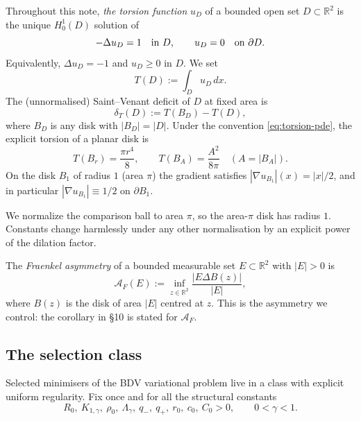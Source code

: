 \documentclass[11pt]{amsart}
\newcommand{\R}{\mathbb R}
\newcommand{\dT}{\delta_T}
\newcommand{\AF}{\mathcal A_F}
\begin{document}
Throughout this note, \emph{the torsion function} \(u_D\) of a bounded
open set \(D\subset\R^2\) is the unique \(H^1_0(D)\) solution of
\begin{equation}\label{eq:torsion-pde}
   -\Delta u_D=1\quad\hbox{in }D,
   \qquad
   u_D=0\quad\hbox{on }\partial D.
\end{equation}
Equivalently, \(\Delta u_D=-1\) and \(u_D\ge 0\) in \(D\).  We set
\[
   T(D):=\int_D u_D\,dx.
\]
The (unnormalised) Saint--Venant deficit of \(D\) at fixed area is
\[
   \dT(D):=T(B_D)-T(D),
\]
where \(B_D\) is any disk with \(|B_D|=|D|\).  Under the convention
\eqref{eq:torsion-pde}, the explicit torsion of a planar disk is
\begin{equation}\label{eq:disk-torsion}
   T(B_r)=\frac{\pi r^4}{8},
   \qquad
   T(B_A)=\frac{A^2}{8\pi}\quad(A=|B_A|).
\end{equation}
On the disk \(B_1\) of radius \(1\) (area \(\pi\)) the gradient satisfies
\(|\nabla u_{B_1}|(x)=|x|/2\), and in particular
\(|\nabla u_{B_1}|\equiv 1/2\) on \(\partial B_1\).

We normalize the comparison ball to area \(\pi\), so the area-\(\pi\)
disk has radius \(1\).  Constants change harmlessly under any other
normalisation by an explicit power of the dilation factor.

The \emph{Fraenkel asymmetry} of a bounded measurable set
\(E\subset\R^2\) with \(|E|>0\) is
\[
   \AF(E):=\inf_{z\in\R^2}\frac{|E\Delta B(z)|}{|E|},
\]
where \(B(z)\) is the disk of area \(|E|\) centred at \(z\).  This is
the asymmetry we control: the corollary in \S10 is stated for \(\AF\).

\subsection{The selection class}

Selected minimisers of the BDV variational problem live in a class
with explicit uniform regularity.  Fix once and for all the
structural constants
\[
   R_0,\ K_{1,\gamma},\ \rho_0,\ \Lambda_\gamma,\ q_-,\ q_+,\ r_0,\
   c_0,\ C_0>0,
   \qquad
   0<\gamma<1.
\]
\end{document}
